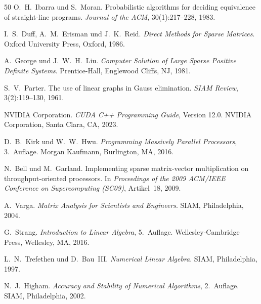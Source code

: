 ﻿\documentclass[a4paper,12pt]{report}
\theoremstyle{definition}
\begin{document}
\begin{thebibliography}{50}
O.~H.~Ibarra und S.~Moran.
\newblock Probabilistic algorithms for deciding equivalence of straight-line programs.
\newblock \textit{Journal of the ACM}, 30(1):217--228, 1983.

I.~S.~Duff, A.~M.~Erisman und J.~K.~Reid.
\newblock \textit{Direct Methods for Sparse Matrices}.
\newblock Oxford University Press, Oxford, 1986.

A.~George und J.~W.~H.~Liu.
\newblock \textit{Computer Solution of Large Sparse Positive Definite Systems}.
\newblock Prentice-Hall, Englewood Cliffs, NJ, 1981.

S.~V.~Parter.
\newblock The use of linear graphs in Gauss elimination.
\newblock \textit{SIAM Review}, 3(2):119--130, 1961.

NVIDIA Corporation.
\newblock \textit{CUDA C++ Programming Guide}, Version 12.0.
\newblock NVIDIA Corporation, Santa Clara, CA, 2023.

D.~B.~Kirk und W.~W.~Hwu.
\newblock \textit{Programming Massively Parallel Processors}, 3.~Auflage.
\newblock Morgan Kaufmann, Burlington, MA, 2016.

N.~Bell und M.~Garland.
\newblock Implementing sparse matrix-vector multiplication on throughput-oriented processors.
\newblock In \textit{Proceedings of the 2009 ACM/IEEE Conference on Supercomputing (SC09)}, Artikel~18, 2009.

A.~Varga.
\newblock \textit{Matrix Analysis for Scientists and Engineers}.
\newblock SIAM, Philadelphia, 2004.

G.~Strang.
\newblock \textit{Introduction to Linear Algebra}, 5.~Auflage.
\newblock Wellesley-Cambridge Press, Wellesley, MA, 2016.

L.~N.~Trefethen und D.~Bau~III.
\newblock \textit{Numerical Linear Algebra}.
\newblock SIAM, Philadelphia, 1997.

N.~J.~Higham.
\newblock \textit{Accuracy and Stability of Numerical Algorithms}, 2.~Auflage.
\newblock SIAM, Philadelphia, 2002.


\end{thebibliography}
\end{document}
